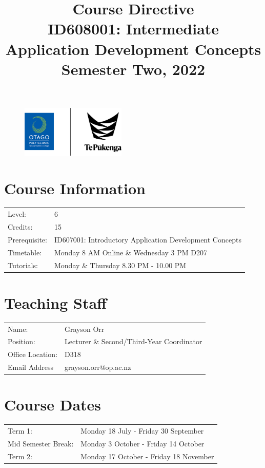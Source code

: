 \documentclass{article}
\author{}
\begin{document}
\begin{figure}
	\includegraphics[width=50mm]{../img/logo.png}
\end{figure}

\title{Course Directive\\ID608001: Intermediate Application Development Concepts\\Semester Two, 2022}
\date{}
\maketitle

\section*{Course Information}
\begin{tabular}{ll}
	Level:        & 6 \\
	Credits:      & 15                                                              \\
	Prerequisite: & ID607001: Introductory Application Development Concepts                                                   \\
	Timetable:    & Monday 8 AM Online \& Wednesday 3 PM D207  \\
	Tutorials:          & Monday \& Thursday 8.30 PM - 10.00 PM                                    
\end{tabular}

\section*{Teaching Staff}
\begin{tabular}{ll}
	Name:            & Grayson Orr                           \\
	Position:        & Lecturer \& Second/Third-Year Coordinator \\
	Office Location: & D318                                 \\
	Email Address    & grayson.orr@op.ac.nz                    \\
\end{tabular}

\section*{Course Dates}
\begin{tabular}{ll}
	Term 1:             &  Monday 18 July - Friday 30 September \\
	Mid Semester Break: &  Monday 3 October - Friday 14 October     \\
	Term 2:             &  Monday 17 October - Friday 18 November      \\
\end{tabular}
\end{document}
